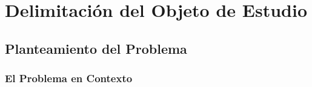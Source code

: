 %
%
%
%
%

\chapter{Delimitación del Objeto de Estudio}
\label{cap:delimitacion}

\section{Planteamiento del Problema}
\label{sec:planteamiento_problema}


\subsection{El Problema en Contexto}
\label{subsec:problema_contexto}

